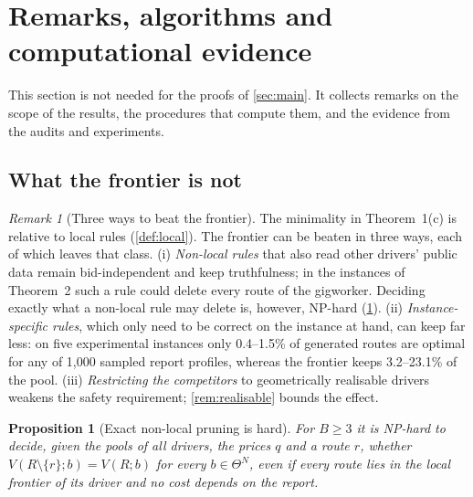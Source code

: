 \documentclass[11pt]{article}
\newtheorem{proposition}{Proposition}
\theoremstyle{definition}
\theoremstyle{remark}
\newtheorem{remark}{Remark}
\begin{document}
\section{Remarks, algorithms and computational evidence}
\label{sec:remarks}

This section is not needed for the proofs of \cref{sec:main}. It collects
remarks on the scope of the results, the procedures that compute them, and the
evidence from the audits and experiments.

\subsection{What the frontier is not}

\begin{remark}[Three ways to beat the frontier]\label{rem:scope}
The minimality in Theorem~1(c) is relative to local rules
(\cref{def:local}). The frontier can be beaten in three ways, each of which
leaves that class.
(i) \emph{Non-local rules} that also read other drivers' public data remain
bid-independent and keep truthfulness; in the instances of Theorem~2 such a rule
could delete every route of the gigworker. Deciding exactly what a non-local
rule may delete is, however, NP-hard (\cref{prop:nonlocal}).
(ii) \emph{Instance-specific rules}, which only need to be correct on the
instance at hand, can keep far less: on five experimental instances only
0.4--1.5\% of generated routes are optimal for any of 1,000 sampled report
profiles, whereas the frontier keeps 3.2--23.1\% of the pool.
(iii) \emph{Restricting the competitors} to geometrically realisable drivers
weakens the safety requirement; \cref{rem:realisable} bounds the effect.
\end{remark}

\begin{proposition}[Exact non-local pruning is hard]\label{prop:nonlocal}
For $B\ge3$ it is NP-hard to decide, given the pools of all drivers, the prices
$q$ and a route $r$, whether $V(R\setminus\{r\};b)=V(R;b)$ for every
$b\in\Theta^N$, even if every route lies in the local frontier of its driver and
no cost depends on the report.
\end{proposition}
\end{document}

